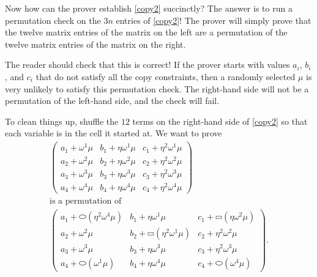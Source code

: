 Now how can the prover establish \hyperref[copy2]{{[}copy2{]}}
succinctly? The answer is to run a permutation check on the \(3n\)
entries of \hyperref[copy2]{{[}copy2{]}}! The prover will simply prove
that the twelve matrix entries of the matrix on the left are a
permutation of the twelve matrix entries of the matrix on the right.

The reader should check that this is correct! If the prover starts with
values \(a_{i}\), \(b_{i}\), and \(c_{i}\) that do not satisfy all the
copy constraints, then a randomly selected \(\mu\) is very unlikely to
satisfy this permutation check. The right-hand side will not be a
permutation of the left-hand side, and the check will fail.

To clean things up, shuffle the \(12\) terms on the right-hand side of
\hyperref[copy2]{{[}copy2{]}} so that each variable is in the cell it
started at. We want to prove \[\begin{array}{r}
\begin{pmatrix}
a_{1} + \omega^{1}\mu & b_{1} + \eta\omega^{1}\mu & c_{1} + \eta^{2}\omega^{1}\mu \\
a_{2} + \omega^{2}\mu & b_{2} + \eta\omega^{2}\mu & c_{2} + \eta^{2}\omega^{2}\mu \\
a_{3} + \omega^{3}\mu & b_{3} + \eta\omega^{3}\mu & c_{3} + \eta^{2}\omega^{3}\mu \\
a_{4} + \omega^{4}\mu & b_{4} + \eta\omega^{4}\mu & c_{4} + \eta^{2}\omega^{4}\mu
\end{pmatrix} \\
\text{is a permutation of } \\
\begin{pmatrix}
a_{1} + {⬭({\eta^{2}\omega^{4}\mu})} & b_{1} + \eta\omega^{1}\mu & c_{1} + {▭({\eta\omega^{2}\mu})} \\
a_{2} + \omega^{2}\mu & b_{2} + {▭({\eta^{2}\omega^{1}\mu})} & c_{2} + \eta^{2}\omega^{2}\mu \\
a_{3} + \omega^{3}\mu & b_{3} + \eta\omega^{3}\mu & c_{3} + \eta^{2}\omega^{3}\mu \\
a_{4} + {⬭({\omega^{1}\mu})} & b_{4} + \eta\omega^{4}\mu & c_{4} + {⬭({\omega^{4}\mu})}
\end{pmatrix}.
\end{array}\] \label{copy3}{}

